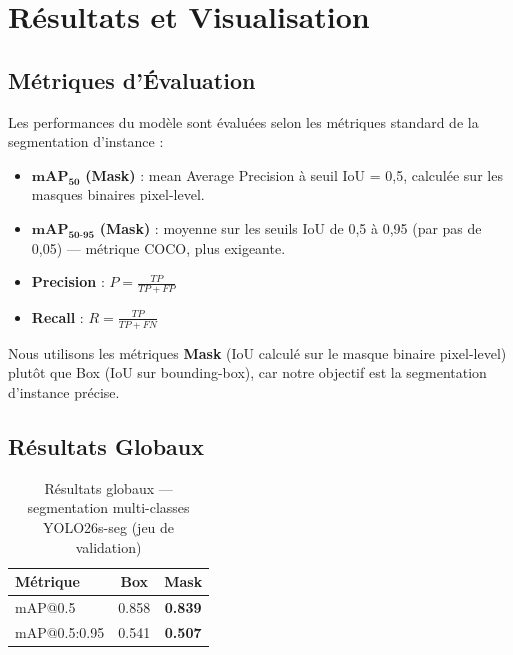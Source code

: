 \documentclass[12pt, a4paper]{report}
\begin{document}
\chapter{Résultats et Visualisation}

\section{Métriques d'Évaluation}

Les performances du modèle sont évaluées selon les métriques standard de la segmentation d'instance :

\begin{itemize}
  \item $\mathbf{mAP_{50}}$ \textbf{(Mask)} : mean Average Precision à seuil IoU = 0,5, calculée sur les masques binaires pixel-level.
  \item $\mathbf{mAP_{50\text{-}95}}$ \textbf{(Mask)} : moyenne sur les seuils IoU de 0,5 à 0,95 (par pas de 0,05) — métrique COCO, plus exigeante.
  \item \textbf{Precision} : $P = \frac{TP}{TP + FP}$
  \item \textbf{Recall} : $R = \frac{TP}{TP + FN}$
\end{itemize}

\begin{notebox}
Nous utilisons les métriques \textbf{Mask} (IoU calculé sur le masque binaire pixel-level) plutôt que Box (IoU sur bounding-box), car notre objectif est la segmentation d'instance précise.
\end{notebox}

\section{Résultats Globaux}

\begin{table}[H]
  \centering
  \caption{Résultats globaux — segmentation multi-classes YOLO26s-seg (jeu de validation)}
  \label{tab:results_global}
  \begin{tabular}{lcc}
    \toprule
    \rowcolor{themebluevlight}
    \textbf{Métrique} & \textbf{Box} & \textbf{Mask} \\
    \midrule
    mAP@0.5       & 0.858 & \textbf{0.839} \\
    mAP@0.5:0.95  & 0.541 & \textbf{0.507} \\
    \bottomrule
  \end{tabular}
\end{table}
\end{document}
